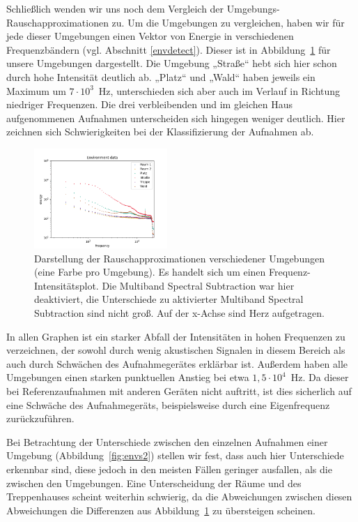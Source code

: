 \documentclass[
	fontsize=10.5pt,
	marginpar=false,
	ngerman,
	accentcolor=3d
	]{tudapub}
\begin{document}
Schließlich wenden wir uns noch dem Vergleich der Umgebungs-Rauschapproximationen zu. Um die Umgebungen zu vergleichen, haben wir für jede dieser Umgebungen einen Vektor von Energie in verschiedenen Frequenzbändern (vgl. Abschnitt \ref{envdetect}). Dieser ist in Abbildung~\ref{fig:envs} für unsere Umgebungen dargestellt. Die Umgebung „Straße“ hebt sich hier schon durch hohe Intensität deutlich ab. „Platz“ und „Wald“ haben jeweils ein Maximum um $7\cdot10^3$~Hz, unterschieden sich aber auch im Verlauf in Richtung niedriger Frequenzen. Die drei verbleibenden und im gleichen Haus aufgenommenen Aufnahmen unterscheiden sich hingegen weniger deutlich. Hier zeichnen sich Schwierigkeiten bei der Klassifizierung der Aufnahmen ab.

\begin{figure}[h]
	\centering
	\includegraphics[width=0.45\textwidth]{media/envs}
	\caption{Darstellung der Rauschapproximationen verschiedener Umgebungen (eine Farbe pro Umgebung). Es handelt sich um einen Frequenz-Intensitätsplot. Die Multiband Spectral Subtraction war hier deaktiviert, die Unterschiede zu aktivierter Multiband Spectral Subtraction sind nicht groß. Auf der x-Achse sind Herz aufgetragen.}
	\label{fig:envs}
\end{figure}

In allen Graphen ist ein starker Abfall der Intensitäten in hohen Frequenzen zu verzeichnen, der sowohl durch wenig akustischen Signalen in diesem Bereich als auch durch Schwächen des Aufnahmegerätes erklärbar ist. Außerdem haben alle Umgebungen einen starken punktuellen Anstieg bei etwa $1,5\cdot10^4$~Hz. Da dieser bei Referenzaufnahmen mit anderen Geräten nicht auftritt, ist dies sicherlich auf eine Schwäche des Aufnahmegeräts, beispielsweise durch eine Eigenfrequenz zurückzuführen.

Bei Betrachtung der Unterschiede zwischen den einzelnen Aufnahmen einer Umgebung (Abbildung~\ref{fig:envs2}) stellen wir fest, dass auch hier Unterschiede erkennbar sind, diese jedoch in den meisten Fällen geringer ausfallen, als die zwischen den Umgebungen. Eine Unterscheidung der Räume und des Treppenhauses scheint weiterhin schwierig, da die Abweichungen zwischen diesen Abweichungen die Differenzen aus Abbildung~\ref{fig:envs} zu übersteigen scheinen.
\end{document}
